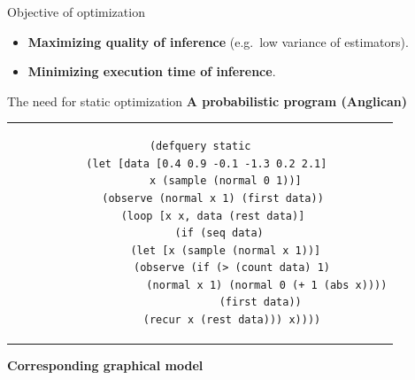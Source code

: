 \documentclass[t]{beamer}
\newlength{\cheight}
\begin{document}
\begin{frame}[fragile]{}
\begin{minipage}[c][\cheight][t]{0.48\linewidth}
    \vfill

    \begin{block}{Objective of optimization}
      \begin{itemize}
        \item \textbf{Maximizing quality of inference} (e.g.\ low variance of
          estimators).

        \item
          \vspace{1cm}
          \textbf{Minimizing execution time of inference}.
    \end{itemize}
  \end{block}

  \vfill

  \begin{block}{The need for static optimization}
    \textbf{A probabilistic program (Anglican)}

    \vspace{5mm}
    \begin{center}
      \begin{tabular}{c}
        \begin{lstlisting}
(defquery static
  (let [data [0.4 0.9 -0.1 -1.3 0.2 2.1]
        x (sample (normal 0 1))]
    (observe (normal x 1) (first data))
    (loop [x x, data (rest data)]
      (if (seq data)
        (let [x (sample (normal x 1))]
          (observe (if (> (count data) 1)
                     (normal x 1) (normal 0 (+ 1 (abs x))))
                   (first data))
          (recur x (rest data))) x))))
        \end{lstlisting}
      \end{tabular}
    \end{center}
    \vspace{10mm}

    \textbf{Corresponding graphical model}


\end{block}
\end{minipage}
\end{frame}
\end{document}
